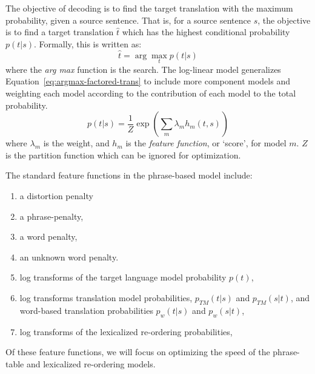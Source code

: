 \documentclass[11pt]{article}
\begin{document}
The objective of decoding is to find the target translation with the maximum probability, given a source sentence. That is, for a source sentence $s$, the objective is to find a target translation $\hat{t}$ which has the highest conditional probability $p(t | s)$. Formally, this is written as:
\begin{equation}
\hat{t} = \arg \max_t p( t | s )
\label{eq:argmax-factored-trans}
\end{equation}
where the \emph{arg max} function is the search. The log-linear model generalizes Equation~\ref{eq:argmax-factored-trans} to include more component models and weighting each model according to the contribution of each model to the total probability. 
\begin{equation}
\label{eq:Log-Linear}
p(t | s) 	=  \frac{1}{Z} \exp ( \sum_m \lambda_m h_m ( t, s)^{} )
\end{equation}
where $\lambda_m$ is the weight, and $h_m$ is the \emph{feature function}, or `score', for model $m$. $Z$ is the partition function which can be ignored for optimization. 

The standard feature functions in the phrase-based model include:
\begin{enumerate}
  \item \vspace{-2 mm} a distortion penalty
  \item \vspace{-2 mm} a phrase-penalty,
  \item \vspace{-2 mm} a word penalty,
  \item \vspace{-2 mm} an unknown word penalty.
  \item \vspace{-2 mm} log transforms of the target language model probability $p(t)$, 
  \item \vspace{-2 mm} log transforms translation model probabilities, $p_{TM}(t|s) $ and $p_{TM}(s|t)$, and word-based translation probabilities $p_w(t|s)$ and $p_w(s|t)$,
  \item \vspace{-2 mm} log transforms of the lexicalized re-ordering probabilities,
\end{enumerate}

Of these feature functions, we will focus on optimizing the speed of the phrase-table and lexicalized re-ordering models.
\end{document}

